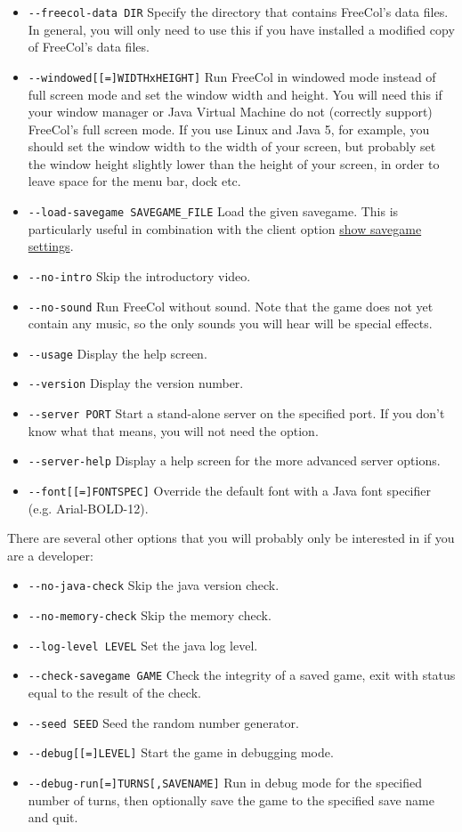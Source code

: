 \documentclass[12pt]{book}
\begin{document}
\begin{itemize}
\item\verb$--freecol-data DIR$ Specify the directory that contains
FreeCol's data files. In general, you will only need to use this if
you have installed a modified copy of FreeCol's data files.
\item\verb$--windowed[[=]WIDTHxHEIGHT]$ Run FreeCol in windowed mode
instead of full screen mode and set the window width and height. You
will need this if your window manager or Java Virtual Machine do not
(correctly support) FreeCol's full screen mode. If you use Linux and
Java 5, for example, you should set the window width to the width of
your screen, but probably set the window height slightly lower than
the height of your screen, in order to leave space for the menu bar,
dock etc.
\item\verb$--load-savegame SAVEGAME_FILE$ Load the given
savegame. This is particularly useful in combination with the client
option \hyperlink{show savegame settings}{show savegame settings}.
\item\verb$--no-intro$ Skip the introductory video.
\item\verb$--no-sound$ Run FreeCol without sound. Note that the game
does not yet contain any music, so the only sounds you will hear will
be special effects.
\item\verb$--usage$ Display the help screen.
\item\verb$--version$ Display the version number.
\item\verb$--server PORT$ Start a stand-alone server on the specified
port. If you don't know what that means, you will not need the option.
\item\verb$--server-help$ Display a help screen for the more advanced
server options.
\item\verb$--font[[=]FONTSPEC]$ Override the default font with a Java
font specifier (e.g. Arial-BOLD-12).
\end{itemize}

There are several other options that you will probably only be
interested in if you are a developer:

\begin{itemize}
\item\verb$--no-java-check$ Skip the java version check.
\item\verb$--no-memory-check$ Skip the memory check.
\item\verb$--log-level LEVEL$ Set the java log level.
\item\verb$--check-savegame GAME$ Check the integrity of a saved game,
  exit with status equal to the result of the check.
\item\verb$--seed SEED$ Seed the random number generator.
\item\verb$--debug[[=]LEVEL]$ Start the game in debugging mode.
\item\verb$--debug-run[=]TURNS[,SAVENAME]$ Run in debug mode for the
  specified number of turns, then optionally save the game to the
  specified save name and quit.
\end{itemize}
\end{document}
